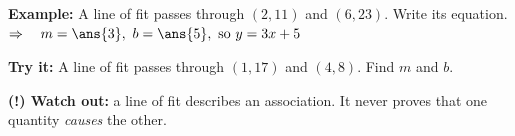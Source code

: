 \documentclass[12pt]{article}
\begin{document}
\begin{examplebox}
\textbf{Example:} \quad A line of fit passes through $(2, 11)$ and $(6, 23)$. Write its equation.
$\Rightarrow\quad m = \ans{3},\ b = \ans{5}, \text{ so } y = 3x + 5$
\end{examplebox}

\begin{tryitbox}
\textbf{Try it:} \quad A line of fit passes through $(1, 17)$ and $(4, 8)$. Find $m$ and $b$.\\[2pt]
\end{tryitbox}

\begin{watchoutbox}
\textbf{(!) Watch out:} a line of fit describes an association. It never proves that one quantity
\textit{causes} the other.
\end{watchoutbox}
\end{document}
